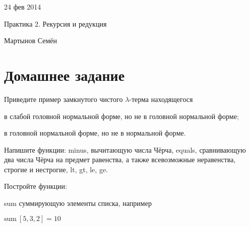\documentclass[a4paper,12pt]{article} %
\begin{document}
\begin{flushright}
{\color{red} 24 фев 2014}

Практика 2. Рекурсия и редукция

Мартынов Семён

\hrulefill
\end{flushright}

\section{Домашнее задание}

\begin{enumerate}

{\item Приведите пример замкнутого чистого $\lambda$-терма находящегося}
\begin{itemize}
{\item в слабой головной нормальной форме, но не в головной нормальной форме;}
{\color{blue}
	\begin{adjustwidth}{1em}{0pt}
	\end{adjustwidth}
}
{\item в головной нормальной форме, но не в нормальной форме.}
{\color{blue}
	\begin{adjustwidth}{1em}{0pt}
	\end{adjustwidth}
}
\end{itemize}


{\item Напишите функции: minus, вычитающую числа Чёрча, equals, сравнивающую два числа Чёрча на предмет равенства, а также всевозможные неравенства, строгие и нестрогие, lt, gt, le, ge.}
{\color{blue}
	\begin{adjustwidth}{1em}{0pt}
	\end{adjustwidth}
}
  

{\item Постройте функции:}
\begin{itemize}
{\item sum суммирующую элементы списка, например
   	\begin{center}
	$\mathrm{sum \ [5,3,2] = 10}$
\end{center}
}


\end{itemize}
\end{enumerate}
\end{document}
